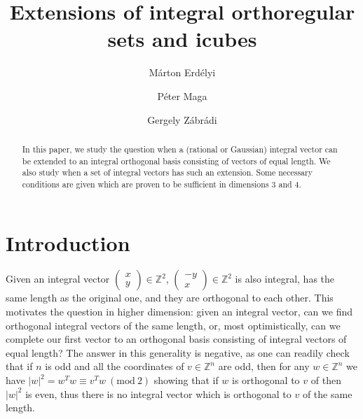 \documentclass[11pt]{amsart}
\title{Extensions of integral orthoregular sets and icubes}
\author{Márton Erdélyi}
\author{Péter Maga}
\author{Gergely Zábrádi}
\date{}
\newcommand{\Mod}[1]{~(\mathrm{mod}~#1)}
\newcommand{\ZZ}{\mathbb{Z}}
\theoremstyle{definition}
\theoremstyle{remark}
\begin{document}


\maketitle

\begin{abstract} In this paper, we study the question when a (rational or Gaussian) integral vector can be extended to an integral orthogonal basis consisting of vectors of equal length. We also study when a set of integral vectors has such an extension. Some necessary conditions are given which are proven to be sufficient in dimensions $3$ and $4$.
\end{abstract}

\section{Introduction}

Given an integral vector $\left(\begin{smallmatrix}x \\ y \end{smallmatrix}\right)\in\ZZ^2$, $\left(\begin{smallmatrix}-y \\ x \end{smallmatrix}\right)\in\ZZ^2$ is also integral, has the same length as the original one, and they are orthogonal to each other. This motivates the question in higher dimension: given an integral vector, can we find orthogonal integral vectors of the same length, or, most optimistically, can we complete our first vector to an orthogonal basis consisting of integral vectors of equal length?
The answer in this generality is negative, as one can readily check that if $n$ is odd and all the coordinates of $v\in\ZZ^n$ are odd, then for any $w\in\ZZ^n$ we have $|w|^2=w^Tw\equiv v^Tw \Mod{2}$ showing that if $w$ is orthogonal to $v$ of then $|w|^2$ is even, thus there is no integral vector which is orthogonal to $v$ of the same length.
\end{document}
